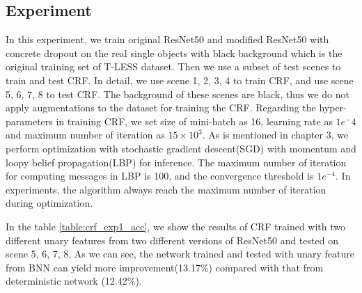 \subsection{Experiment }
In this experiment, we train original ResNet50 and modified ResNet50 with concrete dropout on the real single objects with black background which is the original training set of T-LESS dataset. Then we use a subset of test scenes to train and test CRF. In detail, we use scene 1, 2, 3, 4 to train CRF, and use scene 5, 6, 7, 8 to test CRF. The background of these scenes are black, thus we do not apply augmentations to the dataset for training the CRF. Regarding the hyper-parameters in training CRF, we set size of mini-batch as 16, learning rate as $1e^-4$ and maximum number of iteration as $15\times10^3$. As is mentioned in chapter 3, we perform optimization with stochastic gradient descent(SGD) with momentum and loopy belief propagation(LBP) for inference. The maximum number of iteration for computing messages in LBP is 100, and the convergence threshold is $1e^{-4}$. In experiments, the algorithm always reach the maximum number of iteration during optimization.

In the table \ref{table:crf_exp1_acc}, we show the results of CRF trained with two different unary features from two different versions of ResNet50 and tested on scene 5, 6, 7, 8. As we can see, the network trained and tested with unary feature from BNN can yield more improvement(13.17\%) compared with that from deterministic network (12.42\%).  

